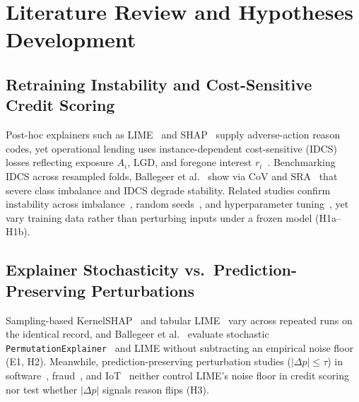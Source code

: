 \documentclass[conference]{IEEEtran}
\begin{document}
\section{Literature Review and Hypotheses Development}
\label{sec:lit}

\subsection{Retraining Instability and Cost-Sensitive Credit Scoring}
Post-hoc explainers such as LIME~\cite{ribeiro2016} and SHAP~\cite{lundberg2017,lundberg2020} supply adverse-action reason codes, yet operational lending uses instance-dependent cost-sensitive (IDCS) losses reflecting exposure $A_i$, $\mathrm{LGD}$, and foregone interest $r_i$~\cite{bahnsen2014,hoppner2022,vanderschueren2022b}. Benchmarking IDCS across resampled folds, Ballegeer et al.~\cite{ballegeer2025} show via $\mathrm{CoV}$ and $\mathrm{SRA}$~\cite{ekstrom2019} that severe class imbalance and IDCS degrade stability. Related studies confirm instability across imbalance~\cite{chen2024}, random seeds~\cite{lin2025shap,alkan2026}, and hyperparameter tuning~\cite{qi2026}, yet vary training data rather than perturbing inputs under a frozen model (H1a--H1b).

\subsection{Explainer Stochasticity vs.\ Prediction-Preserving Perturbations}
Sampling-based KernelSHAP~\cite{kelodjou2024} and tabular LIME~\cite{nnadi2026,zhou2021,visani2022,tzionis2026} vary across repeated runs on the identical record, and Ballegeer et al.~\cite{ballegeer2025} evaluate stochastic \texttt{PermutationExplainer}~\cite{strumbelj2014} and LIME without subtracting an empirical noise floor (E1, H2). Meanwhile, prediction-preserving perturbation studies ($|\Delta p|\le\tau$) in software~\cite{hasnain2026}, fraud~\cite{bhuiyan2026}, and IoT~\cite{tolay2026} neither control LIME's noise floor in credit scoring nor test whether $|\Delta p|$ signals reason flips (H3).
\end{document}
